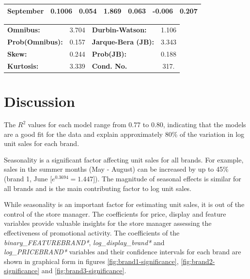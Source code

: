 \documentclass[a4paper,11pt]{article}
\begin{document}
\begin{center}
\begin{tabular}{lcccccc}
\textbf{September}             &       0.1006  &        0.054     &     1.869  &         0.063        &       -0.006    &        0.207     \\
\bottomrule
\end{tabular}
\begin{tabular}{lclc}
\textbf{Omnibus:}       &  3.704 & \textbf{  Durbin-Watson:     } &    1.106  \\
\textbf{Prob(Omnibus):} &  0.157 & \textbf{  Jarque-Bera (JB):  } &    3.343  \\
\textbf{Skew:}          &  0.244 & \textbf{  Prob(JB):          } &    0.188  \\
\textbf{Kurtosis:}      &  3.339 & \textbf{  Cond. No.          } &     317.  \\
\bottomrule
\end{tabular}
\end{center}
\newpage

\section{Discussion}

The $R^2$ values for each model range from 0.77 to 0.80, indicating that the models are a good fit for the data and explain approximately 80\% of the variation in log unit sales for each brand. 

Seasonality is a significant factor affecting unit sales for all brands. For example, sales in the summer months (May - August) can be increased by up to 45\% (brand 1, June [$e^{0.3694}=1.447$]). The magnitude of seasonal effects is similar for all brands and is the main contributing factor to log unit sales.

While seasonality is an important factor for estimating unit sales, it is out of the control of the store manager. The coefficients for price, display and feature variables provide valuable insights for the store manager assessing the effectiveness of promotional activity. The coefficients of the \textit{binary\_FEATUREBRAND*}, \textit{log\_display\_brand*} and \\ \textit{log\_PRICEBRAND*} variables and their confidence intervals for each brand are shown in graphical form in figures \ref{fig:brand1-significance}, \ref{fig:brand2-significance} and \ref{fig:brand3-significance}.
\end{document}
